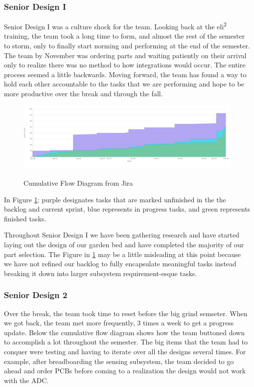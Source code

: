 \subsubsection{Senior Design I}
Senior Design I was a culture shock for the team. Looking back at the eli\textsuperscript{2} training, the team took a long time to form, and almost the rest of the semester to storm, only to finally start norming and performing at the end of the semester. The team by November was ordering parts and waiting patiently on their arrival only to realize there was no method to how integrations would occur. The entire process seemed a little backwards. Moving forward, the team has found a way to hold each other accountable to the tasks that we are performing and hope to be more productive over the break and through the fall.
\begin{figure}[H]
    \caption{Cumulative Flow Diagram from Jira}
    \centering
    \includegraphics[width=\textwidth]{images/Cumulative flow diagram.png}
    \label{fig:cumulativeflow}
\end{figure}
In Figure \ref{fig:cumulativeflow}: purple designates tasks that are marked unfinished in the the backlog and current sprint, blue represents in progress tasks, and green represents finished tasks.

Throughout Senior Design I we have been gathering research and have started laying out the design of our garden bed and have completed the majority of our part selection. The Figure in \ref{fig:cumulativeflow} may be a little misleading at this point because we have not refined our backlog to fully encapsulate meaningful tasks instead breaking it down into larger subsystem requirement-esque tasks.

\subsubsection{Senior Design 2}
Over the break, the team took time to reset before the big grind semseter.
When we got back, the team met more frequently, 3 times a week to get a progress update. Below the cumulative flow diagram shows how the team buttoned down to accomplish a lot throughout the semester.
The big items that the team had to conquer were testing and having to iterate over all the designs several times.
For example, after breadboarding the sensing subsystem, the team decided to go ahead and order PCBs before coming to a realization the design would not work with the ADC.
